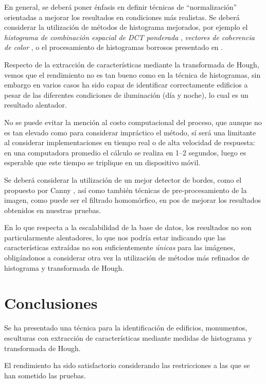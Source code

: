 \documentclass[conference,a4paper,10pt,oneside,final]{tfmpd}
\begin{document}
En general, se deberá poner énfasis en definir técnicas
de ``normalización'' orientadas a mejorar los resultados en condiciones más
realistas. Se deberá considerar la utilización de métodos de histograma
mejorados, por ejemplo el \emph{histograma de combinación espacial de DCT
ponderada} \cite{wdctsch}, \emph{vectores de coherencia de
color} \cite{Pass96histogramrefinement}, o el procesamiento de
histogramas borrosos presentado en \cite{Konstantinidis2005375}.

Respecto de la extracción de características mediante la transformada de Hough,
vemos que el rendimiento no es tan bueno como en la técnica de histogramas,
sin embargo en varios casos ha sido capaz de identificar correctamente
e\-di\-fi\-cios a pesar de las diferentes condiciones de
 iluminación (día y noche), lo cual es un resultado alentador.

No se puede evitar la mención al costo computacional del proceso, que aunque
no es tan elevado como para considerar impráctico el método, sí será una
limitante al considerar implementaciones en tiempo real o de alta velocidad
de respuesta: en una computadora promedio el cálculo se realiza en 1--2
segundos, luego es esperable que este tiempo se triplique en un
dispositivo móvil.

Se deberá considerar la utilización de un mejor detector de bordes, como el
propuesto por Canny \cite{canny},
así como también técnicas de pre-procesamiento de la
imagen, como puede ser el filtrado homomórfico, en pos de mejorar los
resultados obtenidos en nuestras pruebas.

En lo que respecta a la escalabilidad de la base de datos, los resultados no
son particularmente alentadores, lo que nos {podría estar
indicando que las características extraídas no son suficientemente \emph{únicas}
para las imágenes, obligándonos} a considerar otra vez la
utilización de métodos más refinados de histograma y transformada de Hough.
%
%
%
%
\section{Conclusiones}
Se ha presentado una técnica para la identificación de edificios, monumentos,
esculturas con extracción de características mediante medidas de histograma
y transformada de Hough.

El rendimiento ha sido satisfactorio considerando las restricciones a las
que se han sometido las pruebas.
\end{document}
